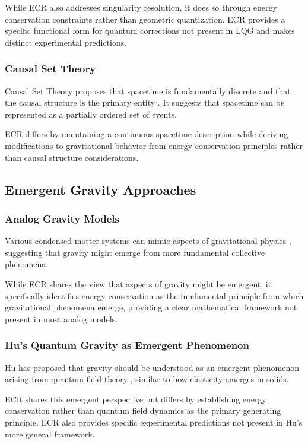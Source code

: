 \documentclass[11pt,a4paper]{article}
\begin{document}
While ECR also addresses singularity resolution, it does so through energy conservation constraints rather than geometric quantization. ECR provides a specific functional form for quantum corrections not present in LQG and makes distinct experimental predictions.

\subsubsection{Causal Set Theory}

Causal Set Theory proposes that spacetime is fundamentally discrete and that the causal structure is the primary entity \cite{sorkin2005}. It suggests that spacetime can be represented as a partially ordered set of events.

ECR differs by maintaining a continuous spacetime description while deriving modifications to gravitational behavior from energy conservation principles rather than causal structure considerations.

\subsection{Emergent Gravity Approaches}

\subsubsection{Analog Gravity Models}

Various condensed matter systems can mimic aspects of gravitational physics \cite{barcelo2005}, suggesting that gravity might emerge from more fundamental collective phenomena.

While ECR shares the view that aspects of gravity might be emergent, it specifically identifies energy conservation as the fundamental principle from which gravitational phenomena emerge, providing a clear mathematical framework not present in most analog models.

\subsubsection{Hu's Quantum Gravity as Emergent Phenomenon}

Hu has proposed that gravity should be understood as an emergent phenomenon arising from quantum field theory \cite{hu2009}, similar to how elasticity emerges in solids.

ECR shares this emergent perspective but differs by establishing energy conservation rather than quantum field dynamics as the primary generating principle. ECR also provides specific experimental predictions not present in Hu's more general framework.
\end{document}
